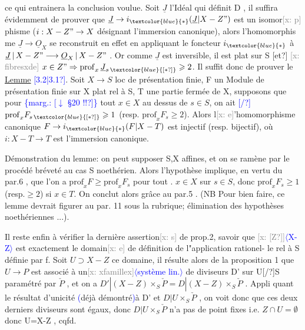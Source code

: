 \documentclass[11pt]{article}
\newcommand{\scanpage}[1]{\par\bigskip\noindent{\small\sffamily[scan #1]}\par}
\newcommand{\mspage}[1]{{\small\sffamily[p.\,#1]}}
\newcommand{\hand}[1]{\textcolor{blue}{#1}}
\newcommand{\inserted}[2][]{\textcolor{blue}{$\langle$#2$\rangle$}}
\newcommand{\margin}[1]{\textcolor{blue}{\{\textsf{marg.:} #1\}}}
\newcommand{\xout}[1]{\textcolor{gray}{[\textsf{x:} #1]}}
\newcommand{\uline}[1]{\underline{#1}}
\newcommand{\unsure}[1]{[#1?]}
\begin{document}
\mspage{117}

\clearpage
\scanpage{25/118}
\mspage{\hand{21}}

ce qui entrainera la conclusion voulue. Soit $\underline{J}$ l'Idéal qui définit
D , il suffira évidemment de prouver que $\underline{J}\to i_{\hand{*}}(\underline{J}|X-Z")$ est un isomor\xout{p}
phisme ($i:X-Z"\to X$ désignant l'immersion canonique), alors l'homomorphis
me $\underline{J}\to\underline{O}_X$ se reconstruit en effet en appliquant le foncteur $i_{\hand{*}}$ à
$\underline{J}\,|\,X-Z" \longrightarrow \underline{O}_X\,|\,X-Z"$ . Or comme $\underline{J}$ est inversible, il est plat sur S \unsure{et}
\xout{fibresxde} $x\in Z" \Rightarrow \mathrm{prof}_x\,\underline{J}_{s\,\hand{\unsure{*}}} \geqslant 2$. Il suffit donc de prouver le
\uline{Lemme} \hand{\unsure{3.2|3.1}}. Soit $X\to S$ loc de présentation finie, F un Module de présentation
finie sur X plat rel à S, T une partie fermée de X, supposons que pour
\margin{\unsure{$\downarrow$ \S 20 !!}}
tout $x\in X$ au dessus de $s\in S$, on ait \hand{\unsure{/}} $\mathrm{prof}_x F_{s\,\hand{\unsure{*}}}\geqslant 1$ (resp. $\mathrm{prof}_x F_s \geqslant 2$).
Alors l\xout{e}'homomorphisme canonique $F\to i_{\hand{*}}(F|X-T)$ est injectif (resp.
bijectif), où $i:X-T\to T$ est l'immersion canonique.

Démonstration du lemme: on peut supposer S,X affines, et on se
ramène par le procédé bréveté au cas S noethérien. Alors l'hypothèse
implique, en vertu du par.6 , que l'on a $\mathrm{prof}_x F \geqslant \mathrm{prof}_x F_s$ pour tout .
$x\in X$ sur $s\in S$, donc $\mathrm{prof}_x F_s \geqslant 1$ (resp.$\geqslant 2$) si $x\in T$. On conclut alors
grâce au par.5 . (NB Pour bien faire, ce lemme devrait figurer au par.
11 sous la rubrique; élimination des hypothèses noethériennes ...).

Il reste enfin à vérifier la dernière assertion\xout{s} de prop.2, savoir
que \xout{\unsure{Z}}\inserted{X-Z} est exactement le domain\xout{e} de définition de l"application rationel-%
le rel à S définie par f. Soit $U\supset X-Z$ ce domaine, il résulte alors de
la proposition 1 que $U\longrightarrow P$ est associé à un\xout{xfamillex}\inserted[typed]{système lin.} de diviseurs
D' sur U\unsure{/}S paramétré par $\check{P}$ , et on a $D'|(X-Z)\times_S\check{P} = D|(X-Z)\times_S\check{P}$ . Appli
quant le résultat d'unicité \hand{(}déjà démontré\hand{)}à D' et $D|U\times_S\check{P}$ , on voit donc
que ces deux derniers diviseurs sont égaux, donc $D|U\times_S\check{P}$ n'a pas de
point fixes i.e. $Z\cap U=\emptyset$ donc U=X-Z , cqfd.
\end{document}
